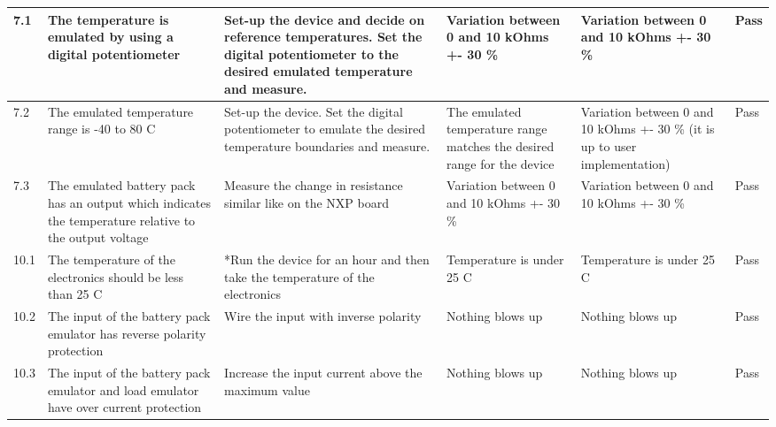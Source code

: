 \begin{table*}[!ht]
\begin{tabular}{|p{0.3cm}|p{3cm}|p{7cm}|p{2.5cm}|p{2cm}|p{1cm}|}
        7.1 & The temperature is emulated by using a digital potentiometer & Set-up the device and decide on reference temperatures. Set the digital potentiometer to the desired emulated temperature and measure.  & Variation between 0 and 10 kOhms +- 30 \% & Variation between 0 and 10 kOhms +- 30 \% & Pass \\ \hline
        7.2 & The emulated temperature range is -40 to 80 C & Set-up the device. Set the digital potentiometer to emulate the desired temperature boundaries and measure.  & The emulated temperature range matches the desired range for the device  & Variation between 0 and 10 kOhms +- 30 \% (it is up to user implementation)& Pass \\ \hline
        7.3 & The emulated battery pack has an output which indicates the temperature relative to the output voltage & Measure the change in resistance similar like on the NXP board & Variation between 0 and 10 kOhms +- 30 \% & Variation between 0 and 10 kOhms +- 30 \% & Pass \\ \hline
        10.1 & The temperature of the electronics should be less than 25 C & *Run the device for an hour and then take the temperature of the electronics & Temperature is under 25 C & Temperature is under 25 C & Pass \\ \hline
        10.2 & The input of the battery pack emulator has reverse polarity protection & Wire the input with inverse polarity  & Nothing blows up & Nothing blows up & Pass \\ \hline
        10.3 & The input of the battery pack emulator and load emulator have over current protection & Increase the input current above the maximum value  & Nothing blows up  & Nothing blows up & Pass \\ \hline
    \end{tabular}
    \label{Test Plan}
\end{table*}